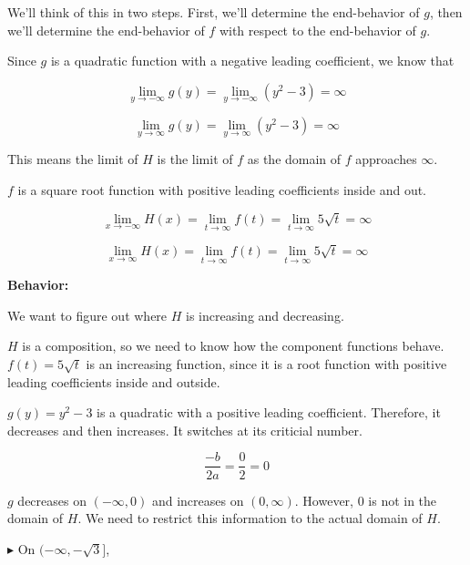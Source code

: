 \documentclass{ximera}
\begin{document}
We'll think of this in two steps. First, we'll determine the end-behavior of $g$, then we'll determine the end-behavior of $f$ with respect to the end-behavior of $g$.


Since $g$ is a quadratic function with a negative leading coefficient, we know that 

\[
\lim\limits_{y \to -\infty} g(y) = \lim\limits_{y \to -\infty} (y^2 - 3)  = \infty
\]


\[
\lim\limits_{y \to \infty} g(y) = \lim\limits_{y \to \infty} (y^2 - 3)  = \infty
\]

This means the limit of $H$ is the limit of $f$ as the domain of $f$ approaches $\infty$. 


$f$ is a square root function with positive leading coefficients inside and out. 

\[
\lim\limits_{x \to -\infty} H(x) =  \lim\limits_{t \to \infty} f(t)  = \lim\limits_{t \to \infty} 5\sqrt{t} = \infty
\]


\[
\lim\limits_{x \to \infty} H(x) =  \lim\limits_{t \to \infty} f(t)  = \lim\limits_{t \to \infty} 5\sqrt{t} = \infty
\]









\textbf{\textcolor{blue!55!black}{Behavior:}} 


We want to figure out where $H$ is increasing and decreasing. 

$H$ is a composition, so we need to know how the component functions behave. \\





$f(t) = 5 \sqrt{t}$ is an increasing function, since it is a root function with positive leading coefficients inside and outside. 

$g(y) = y^2 - 3$ is a quadratic with a positive leading coefficient.  Therefore, it decreases and then increases.   It switches at its criticial number.



\[
\frac{-b}{2 a} = \frac{0}{2} = 0
\]


$g$ decreases on $(-\infty, 0)$ and increases on $(0, \infty)$.  However, $0$ is not in the domain of $H$. We need to restrict this information to the actual domain of $H$. 





\textbf{\textcolor{blue!55!black}{$\blacktriangleright$}} On $(-\infty, -\sqrt{3}]$, 
\end{document}
